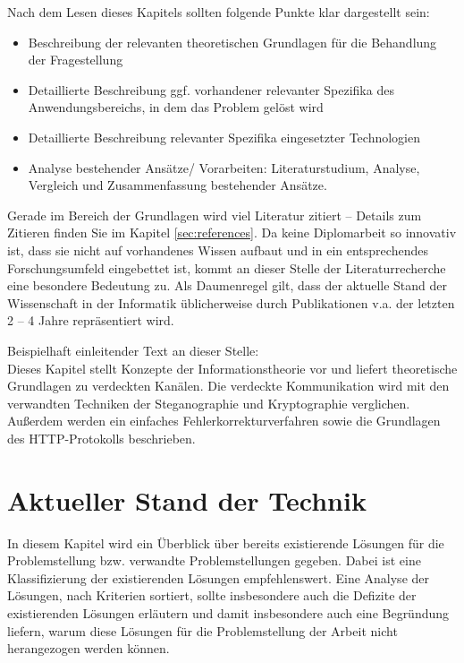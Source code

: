 \makeatletter\ifthesis@masterthesis
Nach dem Lesen dieses Kapitels sollten folgende Punkte klar dargestellt sein:
\begin{itemize}
	\item Beschreibung der relevanten theoretischen Grundlagen für die Behandlung der Fragestellung
	\item Detaillierte Beschreibung ggf. vorhandener relevanter Spezifika des Anwendungsbereichs, in dem das Problem gelöst wird
	\item Detaillierte Beschreibung relevanter Spezifika eingesetzter Technologien
	\item Analyse bestehender Ansätze/ Vorarbeiten: Literaturstudium, Analyse, Vergleich und Zusammenfassung bestehender Ansätze.
\end{itemize}
\fi\makeatother

Gerade im Bereich der Grundlagen wird viel Literatur zitiert -- Details zum Zitieren finden Sie im Kapitel \ref{sec:references}. Da keine Diplomarbeit so innovativ ist, dass sie nicht auf vorhandenes Wissen aufbaut und in ein entsprechendes Forschungsumfeld eingebettet ist, kommt an dieser Stelle der Literaturrecherche eine besondere Bedeutung zu. Als Daumenregel gilt, dass der aktuelle Stand der Wissenschaft in der Informatik üblicherweise durch Publikationen v.a. der letzten 2 – 4 Jahre repräsentiert wird.

\makeatletter\ifthesis@masterthesis
Beispielhaft einleitender Text an dieser Stelle:\\
Dieses Kapitel stellt Konzepte der Informationstheorie vor und liefert theoretische Grundlagen zu verdeckten Kanälen. Die verdeckte Kommunikation wird mit den verwandten Techniken der Steganographie und Kryptographie verglichen. Außerdem werden ein einfaches Fehlerkorrekturverfahren sowie die Grundlagen des HTTP-Protokolls beschrieben.
\fi\makeatother

\section{Aktueller Stand der Technik}

In diesem Kapitel wird ein Überblick über bereits existierende Lösungen für die Problemstellung bzw. verwandte Problemstellungen gegeben. Dabei ist eine Klassifizierung der existierenden Lösungen empfehlenswert. Eine Analyse der Lösungen, nach Kriterien sortiert, sollte insbesondere auch die Defizite der existierenden Lösungen erläutern und damit insbesondere auch eine Begründung liefern, warum diese Lösungen für die Problemstellung der Arbeit nicht herangezogen werden können.

